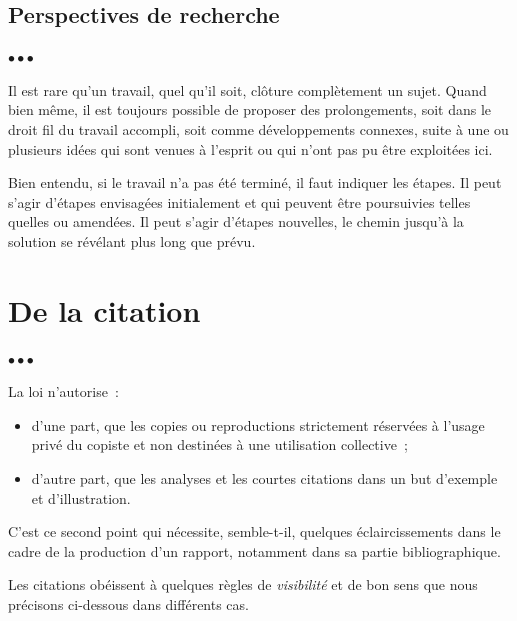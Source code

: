 \documentclass[11pt, french, screen, research-development]{report-rd-info}
\newenvironment{explanation}
{\color{blue}
 \begin{list}{}{\hspace{0.2\textwidth}\color{blue}}\item $\bullet\bullet\bullet$
}
{\end{list}}
\begin{document}
\section{Perspectives de recherche}

\begin{explanation}
   Il est rare qu'un travail, quel qu'il soit, clôture complètement un sujet.
   Quand bien même, il est toujours possible de proposer des prolongements, soit dans le droit fil du travail accompli, soit comme développements connexes, suite à une ou plusieurs idées qui sont venues à l'esprit ou qui n'ont pas pu être exploitées ici.

   Bien entendu, si le travail n'a pas été terminé, il faut indiquer les étapes.
   Il peut s'agir d'étapes envisagées initialement et qui peuvent être poursuivies telles quelles ou amendées.
   Il peut s'agir d'étapes nouvelles, le chemin jusqu'à la solution se révélant plus long que prévu.
\end{explanation}


\nocite{*} %



\listoffigures{} %

\listoftables{} %

\listofalgorithms{} %

\appendix

\chapter{De la citation}
\label{ann:Citations}

\begin{explanation}
   La loi n'autorise~:
   \begin{itemize}
      \item d'une part, que les copies ou reproductions strictement réservées à l'usage privé du copiste et non destinées à une utilisation collective~;
      \item d'autre part, que les analyses et les courtes citations dans un but d'exemple et d'illustration.
   \end{itemize}
   C'est ce second point qui nécessite, semble-t-il, quelques éclaircissements dans le cadre de la production d'un rapport, notamment dans sa partie bibliographique.

   Les citations obéissent à quelques règles de \emph{visibilité} et de bon sens que nous précisons ci-dessous dans différents cas.
\end{explanation}
\end{document}
